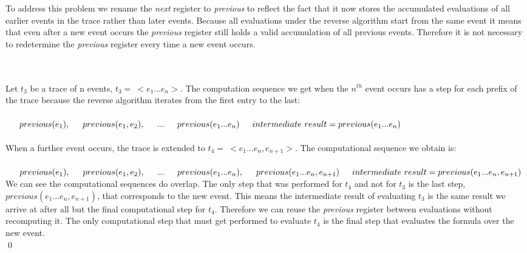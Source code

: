To address this problem we rename the \textit{next} register to \textit{previous} to reflect the fact that it now stores the accumulated evaluations of all earlier events in the trace rather than later events.  Because all evaluations under the reverse algorithm start from the same event it means that even after a new event occurs the \textit{previous} register still holds a valid accumulation of all previous events.  Therefore it is not necessary to redetermine the \textit{previous} register every time a new event occurs.

\begin{myEx}\RRH\\
\\
Let $t_3$ be a trace of n events, $t_3 =\ <e_1 ... e_n>$.  The computation sequence we get when the $n^{th}$ event occurs has a step for each prefix of the trace because the reverse algorithm iterates from the first entry to the last:\\
\\$
\indent previous(e_1),\\
\indent previous(e_1, e_2),\\
\indent ...\\
\indent previous(e_1 ... e_n)\\
\\
\indent intermediate\ result = previous(e_1 ... e_n)$\\
\\
\noindent 
When a further event occurs, the trace is extended to $t_4 =\ <e_1 ... e_n, e_{n+1}>$.  The computational sequence we obtain is:\\
\\$
\indent previous(e_1),\\
\indent previous(e_1, e_2),\\
\indent ...\\
\indent previous(e_1 ... e_n),\\
\indent previous(e_1 ... e_n, e_{n+1})\\
\\
\indent intermediate\ result = previous(e_1 ... e_n, e_{n+1})\\
$\\
We can see the computational sequences do overlap.  The only step that was performed for $t_4$ and not for $t_3$ is the last step, $previous(e_1 ... e_n, e_{n+1})$, that corresponds to the new event.  This means the intermediate result of evaluating $t_3$ is the same result we arrive at after all but the final computational step for $t_4$.  Therefore we can reuse the \textit{previous} register between evaluations without recomputing it.  The only computational step that must get performed to evaluate $t_4$ is the final step that evaluates the formula over the new event.\\
\qed
\end{myEx}

